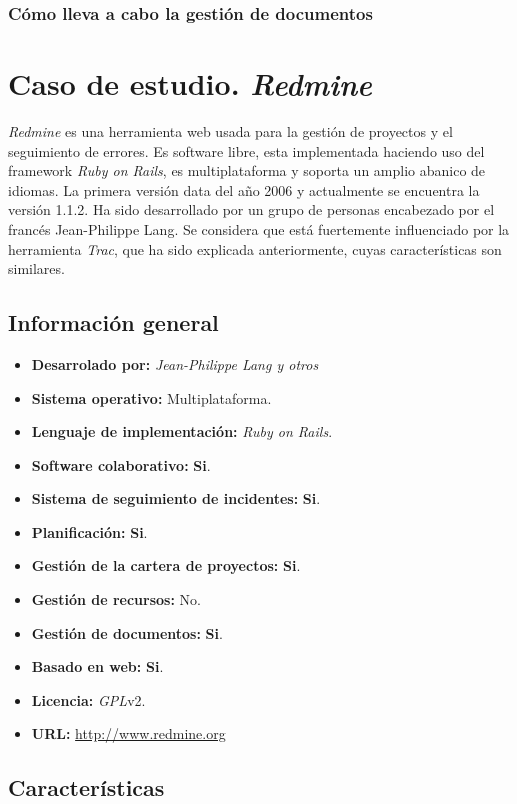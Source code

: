 \documentclass[11pt,a4paper,spanish,twoside]{report}
\begin{document}
	\subsection{Cómo lleva a cabo la gestión de documentos}

\chapter{Caso de estudio. \emph{Redmine}}

\emph{Redmine} es una herramienta web usada para la gestión de proyectos y el
seguimiento de errores. Es software libre, esta implementada haciendo uso
del framework \emph{Ruby on Rails}, es multiplataforma y soporta un amplio
abanico de idiomas. La primera versión data del año 2006 y actualmente se
encuentra la versión 1.1.2. Ha sido desarrollado por un grupo de personas
encabezado por el francés Jean-Philippe Lang. Se considera que está
fuertemente influenciado por la herramienta \emph{Trac}, que ha sido
explicada anteriormente, cuyas características son similares.

\section{Información general}
	\begin{itemize}
		\item \textbf{Desarrolado por:} \emph{Jean-Philippe Lang y otros}
		\item \textbf{Sistema operativo:} Multiplataforma.
		\item \textbf{Lenguaje de implementación:} \emph{Ruby on Rails}.
    \item \textbf{Software colaborativo:} \textbf{Si}.
    \item \textbf{Sistema de seguimiento de incidentes:} \textbf{Si}.
		\item \textbf{Planificación:} \textbf{Si}.
		\item \textbf{Gestión de la cartera de proyectos:} \textbf{Si}.
		\item \textbf{Gestión de recursos:} No.
		\item \textbf{Gestión de documentos:} \textbf{Si}.
		\item \textbf{Basado en web:} \textbf{Si}.
		\item \textbf{Licencia:} \emph{GPL}v2.
		\item \textbf{URL:} \url{http://www.redmine.org}
	\end{itemize}
\section{Características}
\end{document}
